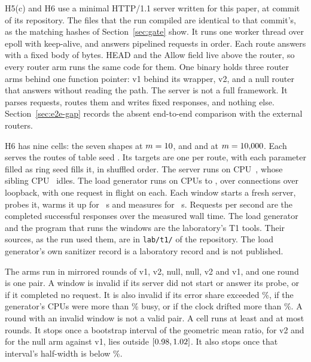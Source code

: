 H5(c) and H6 use a minimal HTTP/1.1 server written for this paper, at commit \ServerPublicCommit{} of
its repository. The files that the run compiled are identical to that commit's, as the matching hashes
of Section~\ref{sec:gate} show. It runs one worker thread over epoll with keep-alive, and answers pipelined requests in order. Each route
answers with a fixed body of \HSixBodyBytes{} bytes. HEAD and the Allow field live above the router,
so every router arm runs the same code for them. One binary holds three router arms behind one
function pointer: v1 behind its wrapper, v2, and a null router that answers without reading the path.
The server is not a full framework. It parses requests, routes them and writes fixed responses,
and nothing else. Section~\ref{sec:e2e-gap} records the absent end-to-end comparison with the
external routers.

H6 has nine cells: the seven shapes at $m=10$, and  and  at
$m=10{,}000$. Each serves the routes of table seed \HSixTableSeed. Its targets are one per
route, with each parameter filled as ring seed \HSixRingSeed{} fills it, in shuffled order. The server
runs on CPU~\HSixServerCpu, whose sibling CPU~\HSixServerSibling{} idles. The load generator runs on
CPUs \HSixGenCpuFirst{} to \HSixGenCpuLast, over \HSixConnections{} connections over loopback, with
one request in flight on each. Each window starts a fresh server, probes it, warms it up for
\HSixWarmupSeconds~s and measures for \HSixWindowSeconds~s. Requests per second are the completed
successful responses over the measured wall time. The load generator and the program that runs the
windows are the laboratory's T1 tools. Their sources, as the run used them, are in \texttt{lab/t1/}
of the repository. The load generator's own sanitizer record is a laboratory record and is not
published.

The arms run in mirrored rounds of v1, v2, null, null, v2 and v1, and one round is one pair. A window
is invalid if its server did not start or answer its probe, or if it completed no request. It is also
invalid if its error share exceeded \HSixErrorSharePct\%, if the generator's CPUs were more than
\HSixGenBusyPct\% busy, or if the clock drifted more than \HSixMhzDriftPct\%. A round with an invalid
window is not a valid pair. A cell runs at least \HSixMinPairs{} and at most \HSixMaxPairs{} rounds. It
stops once a bootstrap interval of the geometric mean ratio, for v2 and for the null arm against v1,
lies outside $[0.98, 1.02]$. It also stops once that interval's half-width is below
\HSixStopHalfWidthPct\%.

